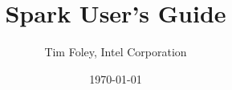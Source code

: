 \documentclass[]{report}
\begin{document}
\title{Spark User's Guide}
\author{Tim Foley, Intel Corporation}
\date{\today}
\maketitle

\tableofcontents

\begin{comment}
\chapter{Introduction}
\section{A First Spark Program}

\begin{figure}
\begin{spark}
shader class Simple
    extends D3D11DrawPass
{
    @Fragment float4 color = float4(0.0f, 0.5f, 1.0f, 1.0f);
    output @Pixel float4 target = color;

    input @Uniform VertexStream[float3] positionStream;
    input @Uniform float4x4 modelViewProj;

    @CoarseVertex float3 P_model = positionStream( IA_VertexID );
    @CoarseVertex float4 P_proj = mul( P_model, modelViewProj );
    override RS_Position = P_proj;

    input @Uniform int triangleCount;
    override IA_DrawSpan = TriangleList( triangleCount );
}
\end{spark}
\caption{\label{fig:simple-example}A simple Spark shader.}
\end{figure}

Figure \ref{fig:simple-example} shows a simple shader written in Spark.
This shader renders triangles in a solid color, producing a result like that in Figure \ref{fig:simple-render}.
We will discuss the main features of the Spark language, with reference to Figure \ref{fig:simple-example}.

\begin{description}
\item[A Spark shader is a class.]{Explain why here.}
\end{description}

Let's look at the lines of this shader in more detail, and discuss the concepts of the Spark language.

TODO: Actually do that!

\chapter{Spark Language Guide}

\chapter{Spark Language Reference}
\end{comment}
\end{document}
